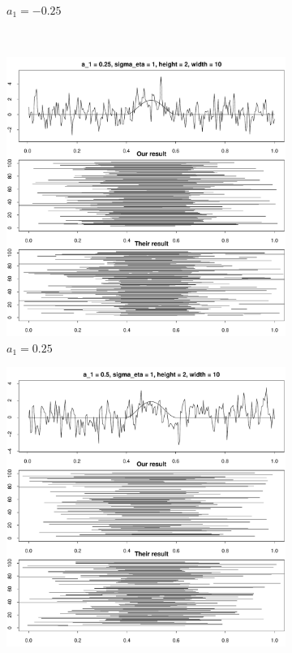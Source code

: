\documentclass[a4paper,12pt]{article}
\begin{document}
\begin{figure}
\begin{subfigure}{.5\textwidth}
  \caption{$a_1 = -0.25$}
  \label{fig:sfig2}
\end{subfigure}\\
\begin{subfigure}{.5\textwidth}
  \centering
  \includegraphics[width=.9\linewidth]{Plots/min_int_with_T_250_a1_025_height_2_width_10.pdf}
  \caption{$a_1 = 0.25$}
  \label{fig:sfig3}
\end{subfigure}%
\begin{subfigure}{.5\textwidth}
  \centering
  \includegraphics[width=.9\linewidth]{Plots/min_int_with_T_250_a1_05_height_2_width_10.pdf}

\end{subfigure}
\end{figure}
\end{document}
